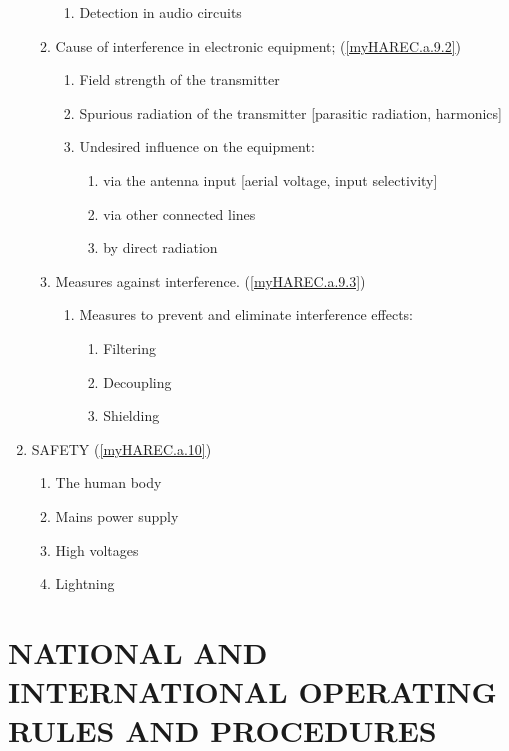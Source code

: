\begin{enumerate}
\begin{enumerate}[noitemsep]
\begin{enumerate}[noitemsep]
\item Detection in audio circuits
\end{enumerate}
\item Cause of interference in electronic equipment; (\ref{myHAREC.a.9.2})\label{HAREC.a.9.2}
\begin{enumerate}[noitemsep]
\item Field strength of the transmitter
\item Spurious radiation of the transmitter [parasitic radiation, harmonics]
\item Undesired influence on the equipment:
\begin{enumerate}[noitemsep]
\item via the antenna input [aerial voltage, input selectivity]
\item via other connected lines
\item by direct radiation
\end{enumerate}
\end{enumerate}
\item Measures against interference. (\ref{myHAREC.a.9.3})\label{HAREC.a.9.3}
\begin{enumerate}[noitemsep]
\item Measures to prevent and eliminate interference effects:
\begin{enumerate}[noitemsep]
\item Filtering
\item Decoupling
\item Shielding
\end{enumerate}
\end{enumerate}
\end{enumerate}
\item SAFETY (\ref{myHAREC.a.10})\label{HAREC.a.10}
\begin{enumerate}[noitemsep]
\item The human body
\item Mains power supply
\item High voltages
\item Lightning
\end{enumerate}
\end{enumerate}

\section{NATIONAL AND INTERNATIONAL OPERATING RULES AND PROCEDURES}


